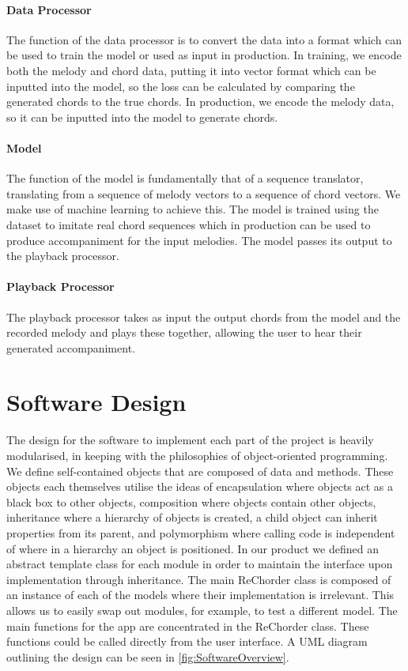 \paragraph{Data Processor}

The function of the data processor is to convert the data into a format which can be used to train the model or used as input in production.
In training, we encode both the melody and chord data, putting it into vector format which can be inputted into the model, so the loss can be calculated by comparing the generated chords to the true chords.
In production, we encode the melody data, so it can be inputted into the model to generate chords.

\paragraph{Model}

The function of the model is fundamentally that of a sequence translator, translating from a sequence of melody vectors to a sequence of chord vectors.
We make use of machine learning to achieve this. 
The model is trained using the dataset to imitate real chord sequences which in production can be used to produce accompaniment for the input melodies.
The model passes its output to the playback processor.

\paragraph{Playback Processor}

The playback processor takes as input the output chords from the model and the recorded melody and plays these together, allowing the user to hear their generated accompaniment.
\section{Software Design}

The design for the software to implement each part of the project is heavily modularised, in keeping with the philosophies of object-oriented programming. 
We define self-contained objects that are composed of data and methods.
These objects each themselves utilise the ideas of encapsulation where objects act as a black box to other objects, composition where objects contain other objects, inheritance where a hierarchy of objects is created, a child object can inherit properties from its parent, and polymorphism where calling code is independent of where in a hierarchy an object is positioned.
In our product we defined an abstract template class for each module in order to maintain the interface upon implementation through inheritance.
The main ReChorder class is composed of an instance of each of the models where their implementation is irrelevant.
This allows us to easily swap out modules, for example, to test a different model.
The main functions for the app are concentrated in the ReChorder class.
These functions could be called directly from the user interface.
A UML diagram outlining the design can be seen in \cref{fig:SoftwareOverview}.


